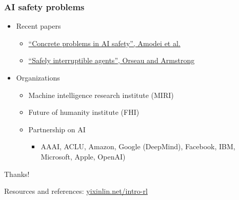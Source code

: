 \documentclass{beamer}
\begin{document}
\begin{frame}
  \frametitle{AI safety problems}

  \begin{itemize}
    \item Recent papers
    \begin{itemize}
      \item \href{https://arxiv.org/abs/1606.06565}{``Concrete problems in AI safety'', Amodei et al.}
      \item \href{https://intelligence.org/files/Interruptibility.pdf}{``Safely interruptible agents'', Orseau and Armstrong}
    \end{itemize}
  \item Organizations
    \begin{itemize}
      \item Machine intelligence research institute (MIRI)
      \item Future of humanity institute (FHI)
      \item Partnership on AI
        \begin{itemize}
          \item AAAI, ACLU, Amazon, Google (DeepMind), Facebook, IBM, Microsoft, Apple, OpenAI)
        \end{itemize}
    \end{itemize}
  \end{itemize}
\end{frame}


\begin{frame}
\Huge{\centerline{Thanks!}}

\Large{\centerline{Resources and references: \href{yixinlin.net/intro-rl}{yixinlin.net/intro-rl}}}

\end{frame}

\end{document}
